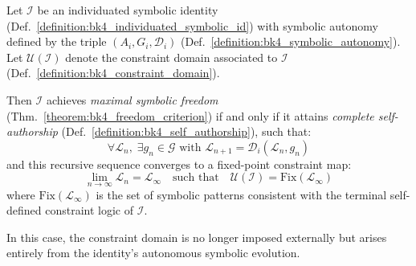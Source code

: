 \begin{theorem}
\label{theorem:bk4_self_authorship_and_freedom}
Let $\mathcal{I}$ be an individuated symbolic identity (Def.~\ref{definition:bk4_individuated_symbolic_id}) with symbolic autonomy defined by the triple $(A_i, G_i, \mathcal{D}_i)$ (Def.~\ref{definition:bk4_symbolic_autonomy}). Let $\mathcal{U}(\mathcal{I})$ denote the constraint domain associated to $\mathcal{I}$ (Def.~\ref{definition:bk4_constraint_domain}).

Then $\mathcal{I}$ achieves \emph{maximal symbolic freedom} (Thm.~\ref{theorem:bk4_freedom_criterion}) if and only if it attains \emph{complete self-authorship} (Def.~\ref{definition:bk4_self_authorship}), such that:
\begin{equation}
    \forall \mathcal{L}_n, \; \exists g_n \in \mathcal{G} \text{ with } \mathcal{L}_{n+1} = \mathcal{D}_i(\mathcal{L}_n, g_n)
\end{equation}
and this recursive sequence converges to a fixed-point constraint map:
\begin{equation}
    \lim_{n \to \infty} \mathcal{L}_n = \mathcal{L}_\infty \quad \text{such that} \quad \mathcal{U}(\mathcal{I}) = \text{Fix}(\mathcal{L}_\infty)
\end{equation}
where $\text{Fix}(\mathcal{L}_\infty)$ is the set of symbolic patterns consistent with the terminal self-defined constraint logic of $\mathcal{I}$.

In this case, the constraint domain is no longer imposed externally but arises entirely from the identity's autonomous symbolic evolution.
\end{theorem}

